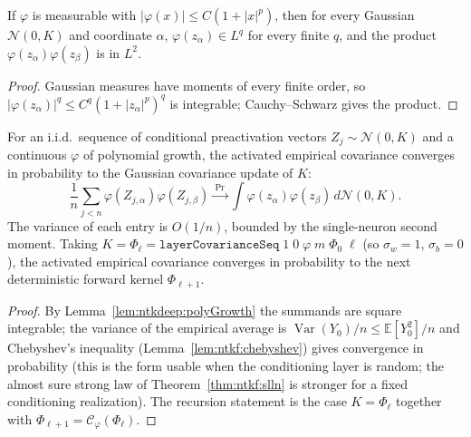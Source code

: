 \begin{lemma}\label{lem:ntkdeep:polyGrowth}
  \leanok
If $\varphi$ is measurable with $|\varphi(x)|\le C(1+|x|^p)$, then for every Gaussian $\mathcal N(0,K)$ and coordinate $\alpha$, $\varphi(z_\alpha)\in L^q$ for every finite $q$, and the product $\varphi(z_\alpha)\varphi(z_\beta)$ is in $L^2$.
\end{lemma}

\begin{proof}
  \leanok
Gaussian measures have moments of every finite order, so $|\varphi(z_\alpha)|^q\le C^q(1+|z_\alpha|^p)^q$ is integrable; Cauchy--Schwarz gives the product.
\end{proof}

\begin{theorem}\label{thm:ntkdeep:covariancePropagation}
  \leanok
For an i.i.d.\ sequence of conditional preactivation vectors $Z_j\sim\mathcal N(0,K)$ and a continuous $\varphi$ of polynomial growth, the activated empirical covariance converges in probability to the Gaussian covariance update of $K$:
\[
  \frac1n\sum_{j<n}\varphi(Z_{j,\alpha})\varphi(Z_{j,\beta})\xrightarrow{\ \Pr\ }\int\varphi(z_\alpha)\varphi(z_\beta)\,d\mathcal N(0,K).
\]
The variance of each entry is $O(1/n)$, bounded by the single-neuron second moment. Taking $K=\Phi_\ell=\texttt{layerCovarianceSeq}\;1\;0\;\varphi\;m\;\Phi_0\;\ell$ (so $\sigma_w=1$, $\sigma_b=0$), the activated empirical covariance converges in probability to the next deterministic forward kernel $\Phi_{\ell+1}$.
\end{theorem}

\begin{proof}
  \leanok
By Lemma~\ref{lem:ntkdeep:polyGrowth} the summands are square integrable; the variance of the empirical average is $\operatorname{Var}(Y_0)/n\le\mathbb E[Y_0^2]/n$ and Chebyshev's inequality (Lemma~\ref{lem:ntkf:chebyshev}) gives convergence in probability (this is the form usable when the conditioning layer is random; the almost sure strong law of
Theorem~\ref{thm:ntkf:slln} is stronger for a fixed conditioning realization). The recursion statement is the case $K=\Phi_\ell$ together with $\Phi_{\ell+1}=\mathcal C_\varphi(\Phi_\ell)$.
\end{proof}


